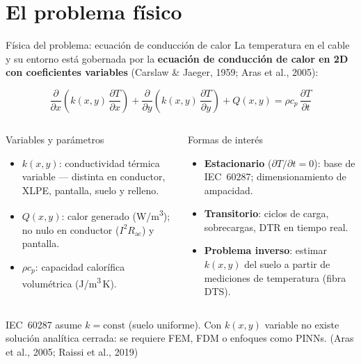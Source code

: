 \documentclass[aspectratio=169]{beamer}
\newcommand{\refcite}[1]{{\footnotesize\color{gray!70!black} #1}}
\begin{document}
\section{El problema físico}

\begin{frame}{Física del problema: ecuación de conducción de calor}
\justifying\small
La temperatura en el cable y su entorno está gobernada por la
\textbf{ecuación de conducción de calor en 2D con coeficientes variables}
\refcite{(Carslaw \& Jaeger, 1959; Aras et al., 2005)}:

\begin{equation*}
\frac{\partial}{\partial x}\!\left(k(x,y)\,\frac{\partial T}{\partial x}\right)+
\frac{\partial}{\partial y}\!\left(k(x,y)\,\frac{\partial T}{\partial y}\right)
+Q(x,y) = \rho c_p\,\frac{\partial T}{\partial t}
\end{equation*}

\vspace{0.1em}
\begin{columns}[T]
\begin{block}{Variables y parámetros}
\scriptsize
\begin{itemize}[leftmargin=*,itemsep=1pt]
    \item $k(x,y)$: conductividad térmica variable --- distinta en
          conductor, XLPE, pantalla, suelo y relleno.
    \item $Q(x,y)$: calor generado (W/m\textsuperscript{3}); no nulo en
          conductor ($I^2 R_\text{ac}$) y pantalla.
    \item $\rho c_p$: capacidad calorífica volumétrica (J/m\textsuperscript{3}\,K).
\end{itemize}
\end{block}

\begin{block}{Formas de interés}
\scriptsize
\begin{itemize}[leftmargin=*,itemsep=1pt]
    \item \textbf{Estacionario} ($\partial T/\partial t = 0$): base de
          IEC~60287; dimensionamiento de ampacidad.
    \item \textbf{Transitorio}: ciclos de carga, sobrecargas, DTR en
          tiempo real.
    \item \textbf{Problema inverso}: estimar $k(x,y)$ del suelo a partir
          de mediciones de temperatura (fibra DTS).
\end{itemize}
\end{block}
\end{columns}

\vspace{0.2em}
\begin{exampleblock}{}\centering\scriptsize
IEC~60287 asume $k=\text{const}$ (suelo uniforme). Con $k(x,y)$ variable
no existe solución analítica cerrada: se requiere FEM, FDM o enfoques como
PINNs. \refcite{(Aras et al., 2005; Raissi et al., 2019)}
\end{exampleblock}
\end{frame}
\end{document}
